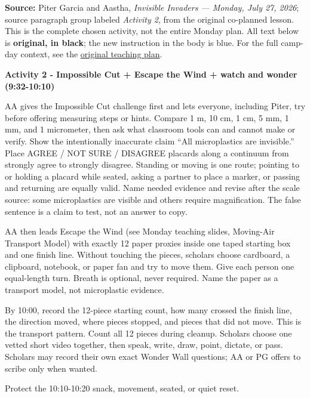 {\small\color{Ink}\textbf{Source:} Piter Garcia and Aastha, \emph{Invisible Invaders --- Monday, July 27, 2026}; source paragraph group labeled \emph{Activity 2}, from the original co-planned lesson. This is the complete chosen activity, not the entire Monday plan. All text below is \textbf{original, in black}; the new instruction in the body is blue. For the full camp-day context, see the \href{https://docs.google.com/document/d/1jc_dSOKXVhSoSbvfbivXlgfYOxrrJ2L6KwbR7LQZCLc/edit}{original teaching plan}.}\par\medskip
\begingroup\small\setlength{\parskip}{0.45em}
\textbf{Activity 2 - Impossible Cut + Escape the Wind + watch and wonder (9:32-10:10)}

AA gives the Impossible Cut challenge first and lets everyone, including Piter, try before offering measuring steps or hints. Compare 1 m, 10 cm, 1 cm, 5 mm, 1 mm, and 1 micrometer, then ask what classroom tools can and cannot make or verify. Show the intentionally inaccurate claim ``All microplastics are invisible.'' Place AGREE / NOT SURE / DISAGREE placards along a continuum from strongly agree to strongly disagree. Standing or moving is one route; pointing to or holding a placard while seated, asking a partner to place a marker, or passing and returning are equally valid. Name needed evidence and revise after the scale source: some microplastics are visible and others require magnification. The false sentence is a claim to test, not an answer to copy.

AA then leads Escape the Wind (see Monday teaching slides, Moving-Air Transport Model) with exactly 12 paper proxies inside one taped starting box and one finish line. Without touching the pieces, scholars choose cardboard, a clipboard, notebook, or paper fan and try to move them. Give each person one equal-length turn. Breath is optional, never required. Name the paper as a transport model, not microplastic evidence.

By 10:00, record the 12-piece starting count, how many crossed the finish line, the direction moved, where pieces stopped, and pieces that did not move. This is the transport pattern. Count all 12 pieces during cleanup. Scholars choose one vetted short video together, then speak, write, draw, point, dictate, or pass. Scholars may record their own exact Wonder Wall questions; AA or PG offers to scribe only when wanted.

Protect the 10:10-10:20 snack, movement, seated, or quiet reset.

